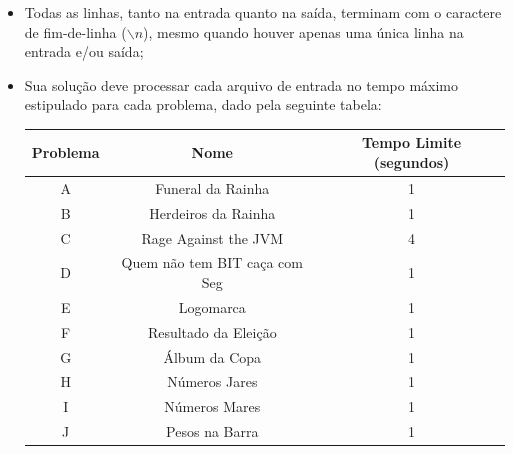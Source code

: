 \documentclass[12pt,oneside]{article} %
\begin{document}
\begin{itemize}

    \item Todas as linhas, tanto na entrada quanto na saída, terminam com o
    caractere de fim-de-linha ($\backslash n$), mesmo quando houver apenas uma única
    linha na entrada e/ou saída;

    \item Sua solução deve processar cada arquivo de entrada no tempo máximo
    estipulado para cada problema, dado pela seguinte tabela:

    \begin{table}[h]
    \centering
    \begin{tabular}{|c|c||c|}
    \hline
    \textbf{Problema} & \textbf{Nome} & \textbf{Tempo Limite (segundos)} \\
    \hline
    A & Funeral da Rainha & 1 \\
    \hline
    B & Herdeiros da Rainha & 1 \\
    \hline
    C & Rage Against the JVM & 4 \\
    \hline
    D & Quem não tem BIT caça com Seg & 1 \\
    \hline
    E & Logomarca & 1 \\
    \hline
    F & Resultado da Eleição & 1 \\
    \hline
    G & Álbum da Copa & 1 \\
    \hline
    H & Números Jares & 1 \\
    \hline
    I & Números Mares & 1 \\
    \hline
    J & Pesos na Barra & 1 \\
    \hline
    \end{tabular}
    \end{table}



\end{itemize}
\end{document}
